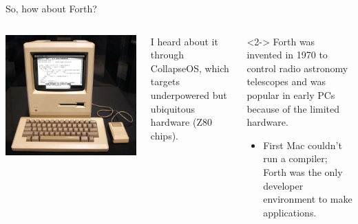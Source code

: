 \documentclass[aspectratio=169]{beamer}
\begin{document}
\begin{frame}{So, how about Forth?}
\vspace{0.28 cm}
\begin{columns}
\includegraphics[width=\linewidth]{macintosh-forth-code.jpg}

I heard about it through CollapseOS, which targets underpowered but ubiquitous hardware (Z80 chips).

\vspace{0.5 cm}
\begin{uncoverenv}<2->
Forth was invented in 1970 to control radio astronomy telescopes and was popular in early PCs because of the limited hardware.
\begin{itemize}
\item First Mac couldn't run a compiler; Forth was the only developer environment to make applications.
\end{itemize}
\end{uncoverenv}

\vspace{0.5 cm}
\end{columns}
\end{frame}
\end{document}
